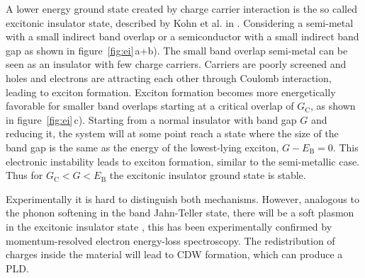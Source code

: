 A lower energy ground state created by charge carrier interaction is the so called excitonic insulator state, described by Kohn et al. in \cite{jerome1967, kohn1967}.
Considering a semi-metal with a small indirect band overlap or a semiconductor with a small indirect band gap as shown in figure~\ref{fig:ei}\,a+b).
The small band overlap semi-metal can be seen as an insulator with few charge carriers.
Carriers are poorly screened and holes and electrons are attracting each other through Coulomb interaction, leading to exciton formation.
Exciton formation becomes more energetically favorable for smaller band overlaps starting at a critical overlap of $G_\mathrm{C}$, as shown in figure~\ref{fig:ei}\,c).
Starting from a normal insulator with band gap $G$ and reducing it, the system will at some point reach a state where the size of the band gap is the same as the energy of the lowest-lying exciton, $G-E_\mathrm{B}=0$.
This electronic instability leads to exciton formation, similar to the semi-metallic case.
Thus for $G_\mathrm{C}<G<E_\mathrm{B}$ the excitonic insulator ground state is stable.

Experimentally it is hard to distinguish both mechanisms.
However, analogous to the phonon softening in the band Jahn-Teller state, there will be a soft plasmon in the excitonic insulator state \cite{kohn1967, rossnagel2011}, this has been experimentally confirmed by momentum-resolved electron energy-loss spectroscopy\cite{kogar2017}.
The redistribution of charges inside the material will lead to \ac{CDW} formation, which can produce a \ac{PLD}.

